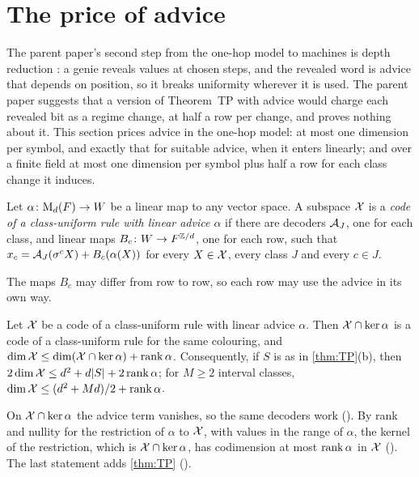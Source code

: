 \section{The price of advice}\label{sec:advice}

The parent paper's second step from the one-hop model to machines is depth reduction
\cite[Section~7.4]{SeventeenthPaper2026}: a genie reveals values at chosen steps, and the revealed word is advice that
depends on position, so it breaks uniformity wherever it is used. The parent paper suggests that a version of
Theorem~TP with advice would charge each revealed bit as a regime change, at half a row per change, and proves nothing
about it. This section prices advice in the one-hop model: at most one dimension per symbol, and exactly that for
suitable advice, when it enters linearly; and over a finite field at most one dimension per symbol plus half a row for
each class change it induces.

\begin{definition}\label{def:linear-advice}
Let $\alpha\colon\mathrm{M}_d(F)\to W$ be a linear map to any vector space. A subspace $\mathcal{X}$ is a \emph{code of a
class-uniform rule with linear advice $\alpha$} if there are decoders $\mathcal{A}_J$, one for each class, and linear maps
$B_c\colon W\to F^{\mathbb{Z}/d}$, one for each row, such that $x_c=\mathcal{A}_J(\sigma^cX)+B_c(\alpha(X))$ for every $X\in\mathcal{X}$, every
class $J$ and every $c\in J$.
\end{definition}

The maps $B_c$ may differ from row to row, so each row may use the advice in its own way.

\begin{theorem}\label{thm:linear-advice}
Let $\mathcal{X}$ be a code of a class-uniform rule with linear advice $\alpha$. Then $\mathcal{X}\cap\ker\alpha$ is a code of a
class-uniform rule for the same colouring, and $\dim\mathcal{X}\le\dim(\mathcal{X}\cap\ker\alpha)+\operatorname{rank}\alpha$. Consequently, if $S$ is as in
\cref{thm:TP}(b), then $2\dim\mathcal{X}\le d^2+d\lvert S \rvert+2\operatorname{rank}\alpha$; for $M\ge2$ interval classes,
$\dim\mathcal{X}\le(d^2+Md)/2+\operatorname{rank}\alpha$.
\end{theorem}

\begin{outline}
On $\mathcal{X}\cap\ker\alpha$ the advice term vanishes, so the same decoders work ().
By rank and nullity for the restriction of $\alpha$ to $\mathcal{X}$, with values in the range of $\alpha$, the kernel of the
restriction, which is $\mathcal{X}\cap\ker\alpha$, has codimension at most $\operatorname{rank}\alpha$ in $\mathcal{X}$
(). The last statement adds \cref{thm:TP}
().
\end{outline}

